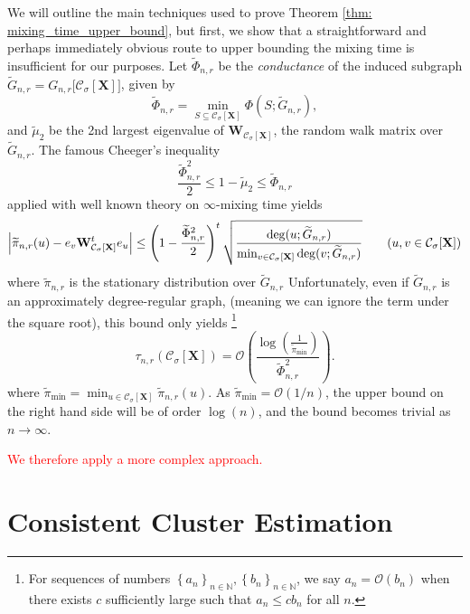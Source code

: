 \documentclass{article}
\newcommand{\set}[1]{\left\{#1\right\}}
\newcommand{\abs}[1]{\left \lvert #1 \right \rvert}
\newcommand{\1}{\mathbf{1}}
\newcommand{\Xbf}{\mathbf{X}}
\newcommand{\Wbf}{\mathbf{W}}
\newcommand{\Cset}{\mathcal{C}}
\newcommand{\Csig}{\Cset_{\sigma}}
\theoremstyle{aldenthm}
\theoremstyle{aldenrmrk}
\begin{document}
We will outline the main techniques used to prove Theorem \ref{thm: mixing_time_upper_bound}, but first, we show that a straightforward and perhaps immediately obvious route to upper bounding the mixing time is insufficient for our purposes. Let $\widetilde{\Phi}_{n,r}$ be the \emph{conductance} of the induced subgraph $\widetilde{G}_{n,r} = G_{n,r}\bigl[\Csig[\Xbf]\bigr]$, given by
\begin{equation*}
\widetilde{\Phi}_{n,r} = \min_{S \subseteq \Csig[\Xbf]} \Phi(S; \widetilde{G}_{n,r}),
\end{equation*}
and $\widetilde{\mu}_2$ be the 2nd largest eigenvalue of $\Wbf_{\Csig[\Xbf]}$, the random walk matrix over $\widetilde{G}_{n,r}$. The famous Cheeger's inequality
\begin{equation*}
\frac{\widetilde{\Phi}_{n,r}^2}{2} \leq 1 - \widetilde{\mu}_2 \leq \widetilde{\Phi}_{n,r}
\end{equation*}
applied with well known theory on $\infty$-mixing time yields
\begin{equation*}
\abs{\widetilde{\pi}_{n,r}(u) - e_v \Wbf_{\Csig[\Xbf]}^te_u} \leq \left(1 - \frac{\widetilde{\Phi}_{n,r}^2}{2}\right)^t \sqrt{\frac{\deg(u; \widetilde{G}_{n,r})}{\min_{v \in \Csig[\Xbf]} \deg(v; \widetilde{G}_{n,r})}} \tag{$u,v \in \Csig[\Xbf]$}
\end{equation*}
where $\widetilde{\pi}_{n,r}$ is the stationary distribution over $\widetilde{G}_{n,r}$ Unfortunately, even if $\widetilde{G}_{n,r}$ is an approximately degree-regular graph, (meaning we can ignore the term under the square root), this bound only yields \footnote{For sequences of numbers $\set{a_n}_{n \in \mathbb{N}}, \set{b_n}_{n \in \mathbb{N}}$, we say $a_n = \mathcal{O}(b_n)$ when there exists $c$ sufficiently large such that $a_n \leq c b_n$ for all $n$.}
\begin{equation*}
\tau_{n,r}(\Csig[\Xbf]) = \mathcal{O} \left( \frac{\log\left(\frac{1}{\widetilde{\pi}_{\min}}\right)}{\widetilde{\Phi}_{n,r}^2} \right).
\end{equation*}
where $\widetilde{\pi}_{\min} = \min_{u \in \Csig[\Xbf]} \widetilde{\pi}_{n,r}(u)$. As $\widetilde{\pi}_{\min} = \mathcal{O}(1/n)$, the upper bound on the right hand side will be of order $\log(n)$, and the bound becomes trivial as $n \to \infty$. 

\textcolor{red}{We therefore apply a more complex approach.} 


\section{Consistent Cluster Estimation}
\label{sec: consistent_cluster_estimation_with_ppr}
\end{document}
